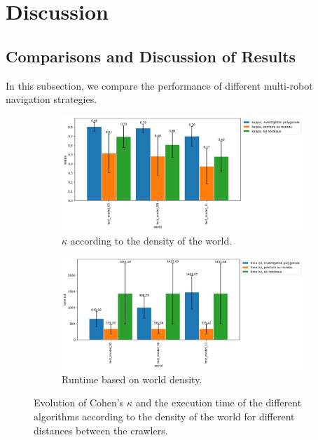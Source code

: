 
\chapter{Discussion}

\section{Comparisons and Discussion of Results}\label{sec:comparaisonresults}

In this subsection, we compare the performance of different multi-robot navigation strategies.

\begin{figure}[h!]
	\begin{subfigure}[t]{0.99\linewidth}
		\includegraphics[width=\linewidth]{graphics/investigation_polygonale-peinture_au_rouleau_ski_nordique-kappa_for_each_world_vs_investigation_polygonale-kappa_for_each_world.png}
		\caption{$\kappa$ according to the density of the world.}
		\label{fig:investigation_polygonale-peinture_au_rouleau_ski_nordique-kappa_for_each_world_vs_investigation_polygonale-kappa_for_each_d}
	\end{subfigure}
	\hfill
	\begin{subfigure}[t]{0.99\linewidth}
		\includegraphics[width=\linewidth]{graphics/investigation_polygonale-peinture_au_rouleau_ski_nordique-time_for_each_world_vs_investigation_polygonale-time_for_each_world.png}
		\caption{Runtime based on world density.}
		\label{fig:investigation_polygonale-peinture_au_rouleau_ski_nordique-time_for_each_world_vs_investigation_polygonale-time_for_each_d}
	\end{subfigure}
	\caption{Evolution of Cohen's $\kappa$ and the execution time of the different algorithms according to the density of the world for different distances between the crawlers.}
	\label{fig:investigation_polygonale-peinture_au_rouleau_ski_nordique_for_each_world}
\end{figure}

